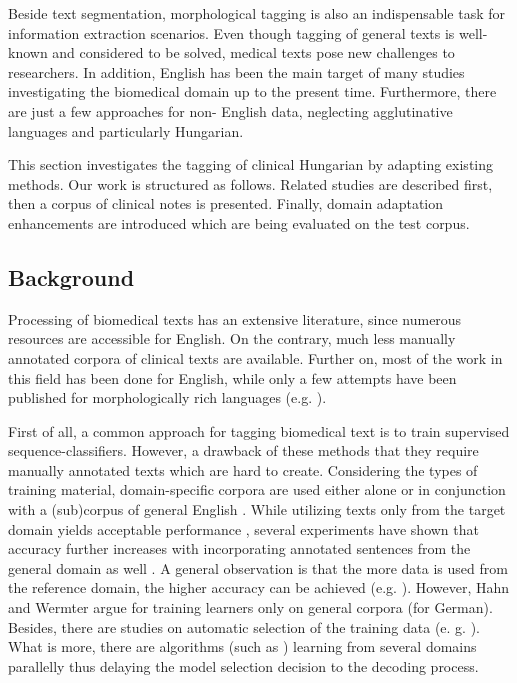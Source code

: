 Beside text segmentation, morphological tagging is also an indispensable task for information extraction scenarios. 
Even though tagging of general texts is well-known and considered to be solved, medical texts pose new challenges to researchers. 
In addition, English has been the main target of many studies investigating the biomedical domain up to the present time. 
Furthermore, there are just a few approaches for non- English data, neglecting agglutinative languages and particularly Hungarian.

This section investigates the tagging of clinical Hungarian by adapting existing methods.%
Our work is structured as follows. 
Related studies are described first, then a corpus of clinical notes is presented.
Finally, domain adaptation enhancements are introduced which are being evaluated on the test corpus.

\subsection{Background}
\label{sec:biomed_tag}

Processing of biomedical texts has an extensive literature, since numerous resources are accessible for English. 
On the contrary, much less manually annotated corpora of clinical texts are available. 
Further on, most of the work in this field has been done for English, while only a few attempts have been published for morphologically rich languages (e.g. \cite{oleynik2009performance,rost2008lessons}).

First of all, a common approach for tagging biomedical text is to train supervised sequence-classifiers. 
However, a drawback of these methods that they require manually annotated texts which are hard to create. %
Considering the types of training material, domain-specific corpora are used either alone \cite{pakhomov2006developing,Savova2010,Smith2006} or in conjunction with a (sub)corpus of general English \cite{coden2005domain,ferraro2013improving,miller2007building}. %
While utilizing texts only from the target domain yields acceptable performance \cite{pakhomov2006developing,Savova2010,Smith2006}, 
several experiments have shown that accuracy further increases with incorporating annotated sentences from the general domain as well \cite{barrett2011token,coden2005domain}. 
A general observation is that the more data is used from the reference domain, the higher accuracy can be achieved (e.g. \cite{pestian2004development}). 
However, Hahn and Wermter argue for training learners only on general corpora \cite{hahn2004tagging} (for German). 
Besides, there are studies on automatic selection of the training data (e. g. \cite{liu2007heuristic}). %
What is more, there are algorithms (such as \cite{choi2012fast}) learning from several domains parallelly thus delaying the model selection decision to the decoding process. 

